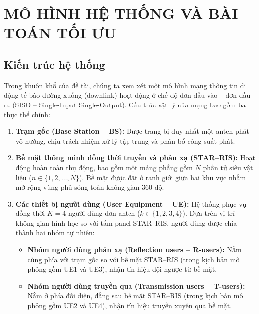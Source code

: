 \chapter{MÔ HÌNH HỆ THỐNG VÀ BÀI TOÁN TỐI ƯU}
\label{chap:mo-hinh-he-thong}

\section{Kiến trúc hệ thống}
\label{sec:kien-truc-he-thong}

Trong khuôn khổ của đề tài, chúng ta xem xét một mô hình mạng thông tin di động tế bào đường xuống
(downlink) hoạt động ở chế độ đơn đầu vào -- đơn đầu ra (SISO -- Single-Input Single-Output). Cấu trúc vật
lý của mạng bao gồm ba thực thể chính:
\begin{enumerate}
\item \textbf{Trạm gốc (Base Station -- BS):} Được trang bị duy nhất một anten phát vô hướng, chịu trách
  nhiệm xử lý tập trung và phân bổ công suất phát.
\item \textbf{Bề mặt thông minh đồng thời truyền và phản xạ (STAR--RIS):} Hoạt động hoàn toàn thụ động, bao
  gồm một mảng phẳng gồm $N$ phần tử siêu vật liệu ($n \in \{1, 2, \dots, N\}$). Bề mặt được đặt ở ranh giới
  giữa hai khu vực nhằm mở rộng vùng phủ sóng toàn không gian 360 độ.
\item \textbf{Các thiết bị người dùng (User Equipment -- UE):} Hệ thống phục vụ đồng thời $K = 4$ người dùng
  đơn anten ($k \in \{1, 2, 3, 4\}$). Dựa trên vị trí không gian hình học so với tấm panel STAR--RIS, người
  dùng được chia thành hai nhóm tự nhiên:
  \begin{itemize}
  \item \textbf{Nhóm người dùng phản xạ (Reflection users -- R-users):} Nằm cùng phía với trạm gốc so với bề
    mặt STAR--RIS (trong kịch bản mô phỏng gồm UE1 và UE3), nhận tín hiệu dội ngược từ bề mặt.
  \item \textbf{Nhóm người dùng truyền qua (Transmission users -- T-users):} Nằm ở phía đối diện, đằng sau bề
    mặt STAR--RIS (trong kịch bản mô phỏng gồm UE2 và UE4), nhận tín hiệu truyền xuyên qua bề mặt.
  \end{itemize}
\end{enumerate}

